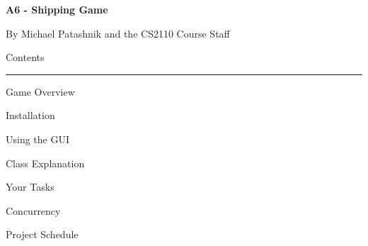 \documentclass[11pt]{article}
\begin{document}
\lstset{language=Java}
\begin{center}
\begin{HUGE}{\bf A6 - Shipping Game}\\ \end{HUGE}
\vspace{3mm}
\begin{LARGE} By Michael Patashnik and the CS2110 Course Staff\\ \end{LARGE}
\vspace{7mm}
\begin{LARGE} Contents\\ \end{LARGE}
\noindent\rule{8cm}{0.4pt}
\begin{enumerate} \begin{large}
\item Game Overview
\item Installation
\item Using the GUI
\item Class Explanation
\item Your Tasks
\item Concurrency
\item Project Schedule
\end{large}\end{enumerate}
\end{center}
\newpage
\end{document}
